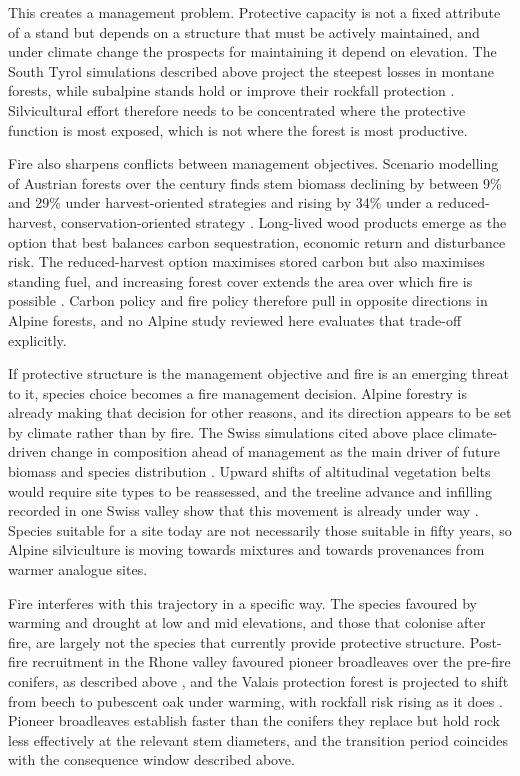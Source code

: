 \documentclass[11pt,a4paper]{article}
\begin{document}
This creates a management problem. Protective capacity is not a fixed attribute of a stand but depends on a structure that must be actively maintained, and under climate change the prospects for maintaining it depend on elevation. The South Tyrol simulations described above project the steepest losses in montane forests, while subalpine stands hold or improve their rockfall protection \citep{hillebrand_contrasting_2023}. Silvicultural effort therefore needs to be concentrated where the protective function is most exposed, which is not where the forest is most productive.

Fire also sharpens conflicts between management objectives. Scenario modelling of Austrian forests over the century finds stem biomass declining by between 9\% and 29\% under harvest-oriented strategies and rising by 34\% under a reduced-harvest, conservation-oriented strategy \citep{jandl_strategies_2018}. Long-lived wood products emerge as the option that best balances carbon sequestration, economic return and disturbance risk. The reduced-harvest option maximises stored carbon but also maximises standing fuel, and increasing forest cover extends the area over which fire is possible \citep{gerberding_mapping_2025}. Carbon policy and fire policy therefore pull in opposite directions in Alpine forests, and no Alpine study reviewed here evaluates that trade-off explicitly.

If protective structure is the management objective and fire is an emerging threat to it, species choice becomes a fire management decision. Alpine forestry is already making that decision for other reasons, and its direction appears to be set by climate rather than by fire. The Swiss simulations cited above place climate-driven change in composition ahead of management as the main driver of future biomass and species distribution \citep{schumacher_relative_2006}. Upward shifts of altitudinal vegetation belts would require site types to be reassessed, and the treeline advance and infilling recorded in one Swiss valley show that this movement is already under way \citep{frei_evidence_2023}. Species suitable for a site today are not necessarily those suitable in fifty years, so Alpine silviculture is moving towards mixtures and towards provenances from warmer analogue sites.

Fire interferes with this trajectory in a specific way. The species favoured by warming and drought at low and mid elevations, and those that colonise after fire, are largely not the species that currently provide protective structure. Post-fire recruitment in the Rhone valley favoured pioneer broadleaves over the pre-fire conifers, as described above \citep{moser_potential_2010}, and the Valais protection forest is projected to shift from beech to pubescent oak under warming, with rockfall risk rising as it does \citep{moos_climate_2021}. Pioneer broadleaves establish faster than the conifers they replace but hold rock less effectively at the relevant stem diameters, and the transition period coincides with the consequence window described above.
\end{document}
